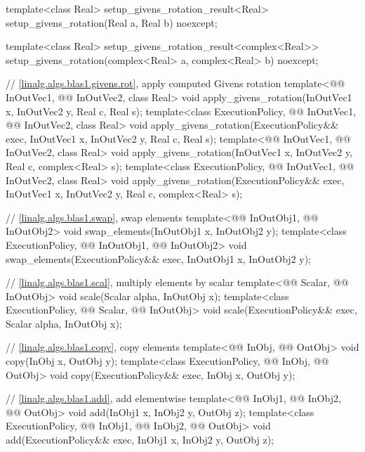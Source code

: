 \begin{codeblock}
{  template<class Real>
    setup_givens_rotation_result<Real> setup_givens_rotation(Real a, Real b) noexcept;

  template<class Real>
    setup_givens_rotation_result<complex<Real>>
      setup_givens_rotation(complex<Real> a, complex<Real> b) noexcept;

  // \ref{linalg.algs.blas1.givens.rot}, apply computed Givens rotation
  template<@@ InOutVec1, @@ InOutVec2, class Real>
    void apply_givens_rotation(InOutVec1 x, InOutVec2 y, Real c, Real s);
  template<class ExecutionPolicy, @@ InOutVec1, @@ InOutVec2, class Real>
    void apply_givens_rotation(ExecutionPolicy&& exec,
                               InOutVec1 x, InOutVec2 y, Real c, Real s);
  template<@@ InOutVec1, @@ InOutVec2, class Real>
    void apply_givens_rotation(InOutVec1 x, InOutVec2 y, Real c, complex<Real> s);
  template<class ExecutionPolicy, @@ InOutVec1, @@ InOutVec2, class Real>
    void apply_givens_rotation(ExecutionPolicy&& exec,
                               InOutVec1 x, InOutVec2 y, Real c, complex<Real> s);

  // \ref{linalg.algs.blas1.swap}, swap elements
  template<@@ InOutObj1, @@ InOutObj2>
    void swap_elements(InOutObj1 x, InOutObj2 y);
  template<class ExecutionPolicy, @@ InOutObj1, @@ InOutObj2>
    void swap_elements(ExecutionPolicy&& exec, InOutObj1 x, InOutObj2 y);

  // \ref{linalg.algs.blas1.scal}, multiply elements by scalar
  template<@@ Scalar, @@ InOutObj>
    void scale(Scalar alpha, InOutObj x);
  template<class ExecutionPolicy, @@ Scalar, @@ InOutObj>
    void scale(ExecutionPolicy&& exec, Scalar alpha, InOutObj x);

  // \ref{linalg.algs.blas1.copy}, copy elements
  template<@@ InObj, @@ OutObj>
    void copy(InObj x, OutObj y);
  template<class ExecutionPolicy, @@ InObj, @@ OutObj>
    void copy(ExecutionPolicy&& exec, InObj x, OutObj y);

  // \ref{linalg.algs.blas1.add}, add elementwise
  template<@@ InObj1, @@ InObj2, @@ OutObj>
    void add(InObj1 x, InObj2 y, OutObj z);
  template<class ExecutionPolicy, @@ InObj1, @@ InObj2, @@ OutObj>
    void add(ExecutionPolicy&& exec, InObj1 x, InObj2 y, OutObj z);

}
\end{codeblock}
